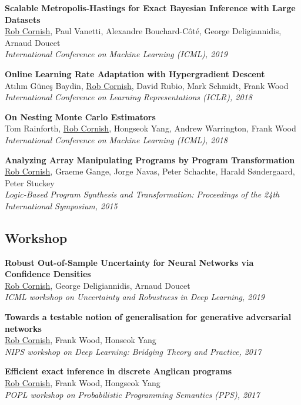 \documentclass[12pt,a4paper]{article}
\begin{document}
\noindent
\textbf{Scalable Metropolis-Hastings for Exact Bayesian Inference with Large Datasets} \\
\underline{Rob Cornish}, Paul Vanetti, Alexandre Bouchard-C\^ot\'e, George Deligiannidis, Arnaud Doucet \\
\textit{International Conference on Machine Learning (ICML), 2019}

\noindent
\textbf{Online Learning Rate Adaptation with Hypergradient Descent} \\
At\i l\i m G\"une\c s Baydin, \underline{Rob Cornish}, David Rubio, Mark Schmidt, Frank Wood \\
\textit{International Conference on Learning Representations (ICLR), 2018}

\noindent
\textbf{On Nesting Monte Carlo Estimators} \\
Tom Rainforth, \underline{Rob Cornish}, Hongseok Yang, Andrew Warrington, Frank Wood \\
\textit{International Conference on Machine Learning (ICML), 2018}

\noindent
\textbf{Analyzing Array Manipulating Programs by Program Transformation} \\
\underline{Rob Cornish}, Graeme Gange, Jorge Navas, Peter Schachte, Harald S\o ndergaard, Peter Stuckey \\
\textit{Logic-Based Program Synthesis and Transformation: Proceedings of the 24th International Symposium, 2015}


\subsection*{Workshop}

\textbf{Robust Out-of-Sample Uncertainty for Neural Networks via Confidence Densities} \\
\underline{Rob Cornish}, George Deligiannidis, Arnaud Doucet \\
\textit{ICML workshop on Uncertainty and Robustness in Deep Learning, 2019}

\noindent
\textbf{Towards a testable notion of generalisation for generative adversarial networks} \\
\underline{Rob Cornish}, Frank Wood, Honseok Yang \\
\textit{NIPS workshop on Deep Learning: Bridging Theory and Practice, 2017}

\noindent
\textbf{Efficient exact inference in discrete Anglican programs} \\
\underline{Rob Cornish}, Frank Wood, Hongseok Yang \\
\textit{POPL workshop on Probabilistic Programming Semantics (PPS), 2017}
\end{document}
